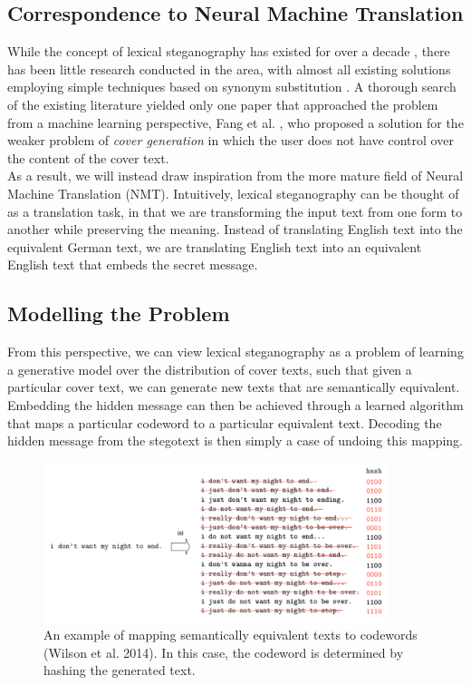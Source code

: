 \documentclass[11pt,a4paper]{article}
\begin{document}
\subsection *{Correspondence to Neural Machine Translation}
  While the concept of lexical steganography has existed for over a decade \cite{tlex}, there has been little research conducted in the area, with almost all existing solutions employing simple techniques based on synonym substitution \cite{universal}. A thorough search of the existing literature yielded only one paper that approached the problem from a machine learning perspective, Fang et al. \citeyear{lstm}, who proposed a solution for the weaker problem of \textit{cover generation} in which the user does not have control over the content of the cover text.\\
  As a result, we will instead draw inspiration from the more mature field of Neural Machine Translation (NMT). Intuitively, lexical steganography can be thought of as a translation task, in that we are transforming the input text from one form to another while preserving the meaning. Instead of translating English text into the equivalent German text, we are translating English text into an equivalent English text that embeds the secret message.
  

\subsection *{Modelling the Problem}

  From this perspective, we can view lexical steganography as a problem of learning a generative model over the distribution of cover texts, such that given a particular cover text, we can generate new texts that are semantically equivalent. Embedding the hidden message can then be achieved through a learned algorithm that maps a particular codeword to a particular equivalent text. Decoding the hidden message from the stegotext is then simply a case of undoing this mapping.\\

  \begin{figure}[htp]
    \centering
    \includegraphics[width=0.9\textwidth]{mapping.png}
    \caption{An example of mapping semantically equivalent texts to codewords (Wilson et al. 2014). In this case, the codeword is determined by hashing the generated text.}
    \label{mapping}
  \end{figure}
\end{document}
